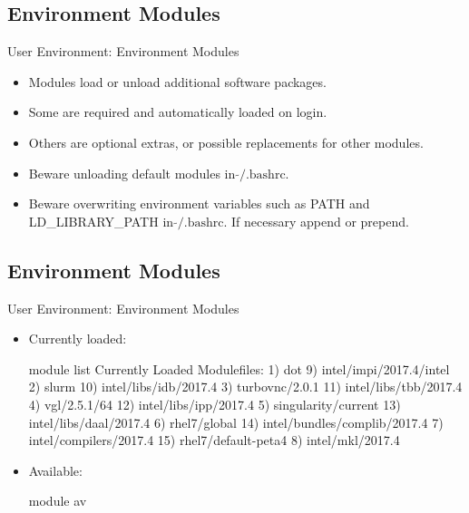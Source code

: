 \subsection{Environment Modules}
\begin{frame}[fragile]{User Environment: Environment Modules}
\begin{itemize}
\item{Modules load or unload additional software packages.}
\item{Some are \alert{required} and automatically loaded on login.}
\item{Others are optional extras, or possible replacements for other modules.}
\item{\alert{Beware} unloading default modules in $\tilde{}\text{/.bashrc}$.}
\item{\alert{Beware} overwriting environment variables such as PATH and LD\_LIBRARY\_PATH in $\tilde{}\text{/.bashrc}$. If necessary append or prepend.}
\end{itemize}
\end{frame}

\subsection{Environment Modules}
\begin{frame}[fragile]{User Environment: Environment Modules}
\begin{itemize}
\item{Currently loaded:}
\begin{semiverbatim}
\scriptsize
module list
Currently Loaded Modulefiles:
  1) dot                            9) intel/impi/2017.4/intel
  2) slurm                         10) intel/libs/idb/2017.4
  3) turbovnc/2.0.1                11) intel/libs/tbb/2017.4
  4) vgl/2.5.1/64                  12) intel/libs/ipp/2017.4
  5) singularity/current           13) intel/libs/daal/2017.4
  6) rhel7/global                  14) intel/bundles/complib/2017.4
  7) intel/compilers/2017.4        15) rhel7/default-peta4
  8) intel/mkl/2017.4
\end{semiverbatim}
\medskip
\item{Available:}
\begin{semiverbatim}
\scriptsize
module av
\end{semiverbatim}
\end{itemize}
\end{frame}

